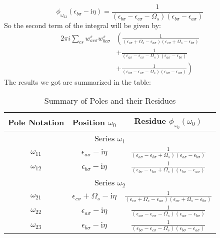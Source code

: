 \documentclass[12pt]{article}
\begin{document}
\begin{equation}
\boxed{\phi_{\omega_{23}}(\epsilon_{b \sigma} - \mathrm{i} \eta) = \frac{1}{(\epsilon_{b \sigma} -\epsilon_{c \sigma}-\Omega_s)(\epsilon_{b \sigma} -\epsilon_{a \sigma})}}
\end{equation}
So the second term of the integral will be given by:
\begin{equation}
\begin{aligned}
2\pi i \sum_{cs} w_{a c \sigma}^s w_{b c \sigma}^s & \left( \frac{1}{(\epsilon_{c \sigma} + \Omega_s -\epsilon_{a \sigma})(\epsilon_{c \sigma} + \Omega_s -\epsilon_{b \sigma})} \right. \\
& \left. + \frac{1}{(\epsilon_{a \sigma} -\epsilon_{c \sigma}-\Omega_s)(\epsilon_{a \sigma} -\epsilon_{b \sigma})} \right. \\
& \left. + \frac{1}{(\epsilon_{b \sigma} -\epsilon_{c \sigma}-\Omega_s)(\epsilon_{b \sigma} -\epsilon_{a \sigma})} \right)
\end{aligned}
\end{equation}
The results we got are summarized in the table:
\begin{table}[h]
\centering
\caption{Summary of Poles and their Residues}
\begin{tabular}{|c|c|c|}
\hline
Pole Notation & Position $\omega_0$ & Residue $\phi_{\omega_0}(\omega_0)$ \\
\hline
\multicolumn{3}{|c|}{Series $\omega_1$} \\
\hline
$\omega_{11}$ & $\epsilon_{a \sigma} - \mathrm{i} \eta$ & $\frac{1}{(\epsilon_{a \sigma} -\epsilon_{k \sigma}+\Omega_s)(\epsilon_{a \sigma} -\epsilon_{b \sigma})}$ \\
$\omega_{12}$ & $\epsilon_{b \sigma} - \mathrm{i} \eta$ & $\frac{1}{(\epsilon_{b \sigma} -\epsilon_{k \sigma}+\Omega_s)(\epsilon_{b \sigma} -\epsilon_{a \sigma})}$ \\
\hline
\multicolumn{3}{|c|}{Series $\omega_2$} \\
\hline
$\omega_{21}$ & $\epsilon_{c \sigma} + \Omega_s - \mathrm{i} \eta$ & $\frac{1}{(\epsilon_{c \sigma} + \Omega_s -\epsilon_{a \sigma})(\epsilon_{c \sigma} + \Omega_s -\epsilon_{b \sigma})}$ \\
$\omega_{22}$ & $\epsilon_{a \sigma} - \mathrm{i} \eta$ & $\frac{1}{(\epsilon_{a \sigma} -\epsilon_{c \sigma}-\Omega_s)(\epsilon_{a \sigma} -\epsilon_{b \sigma})}$ \\
$\omega_{23}$ & $\epsilon_{b \sigma} - \mathrm{i} \eta$ & $\frac{1}{(\epsilon_{b \sigma} -\epsilon_{c \sigma}-\Omega_s)(\epsilon_{b \sigma} -\epsilon_{a \sigma})}$ \\
\end{tabular}
\end{table}
\end{document}
